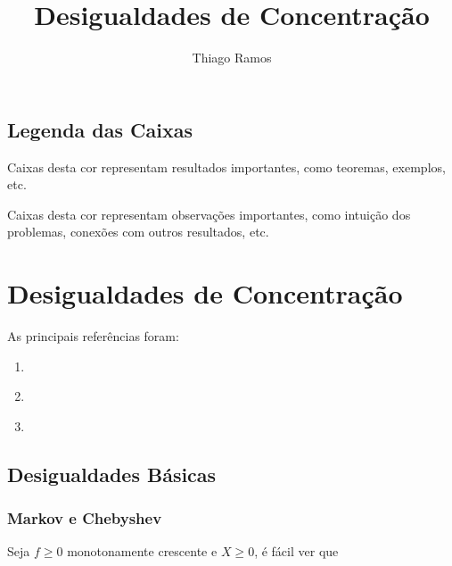 \documentclass[12pt,a4paper,oneside]{book}
\theoremstyle{definition}
\theoremstyle{remark}
\numberwithin{equation}{section}
\begin{document}
\title{{\Huge Desigualdades de Concentração}}

\author{Thiago Ramos}

\maketitle


\tableofcontents
\newpage 


\section*{Legenda das Caixas}


\begin{tcolorbox}
Caixas desta cor representam resultados importantes, como teoremas, exemplos, etc.
\end{tcolorbox}

\begin{tcolorbox}[colback = yellow!70]
Caixas desta cor representam observações importantes, como intuição dos problemas, conexões com outros resultados, etc.
\end{tcolorbox}





\chapter{Desigualdades de Concentração}
\begin{tcolorbox}[colback= white]
As principais referências foram:
\begin{enumerate}
\item \cite{boucheron2013concentration}
\item \cite{vershynin_2018}
\item \cite{taomatrix}
\end{enumerate}
\end{tcolorbox}

\section{Desigualdades Básicas}

\subsection{Markov e Chebyshev}

Seja $f\geq 0$ monotonamente crescente e $X\geq 0$, é fácil ver que
\end{document}
